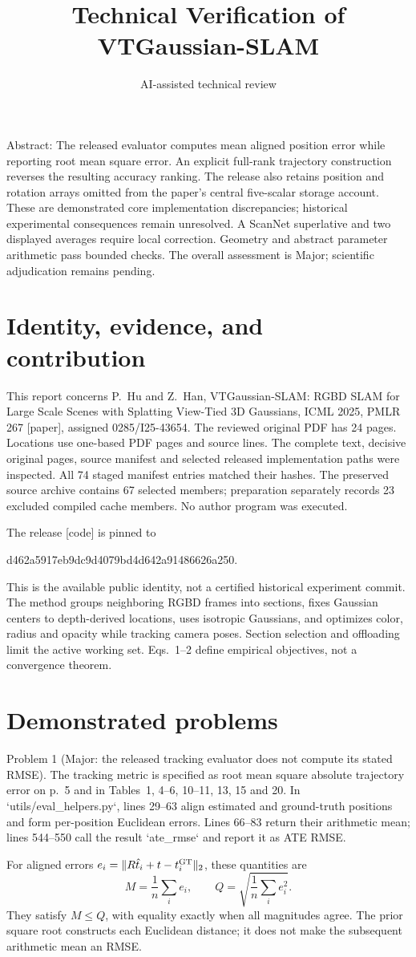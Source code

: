 \documentclass[10pt]{article}
\title{Technical Verification of VTGaussian-SLAM}
\author{AI-assisted technical review}
\date{}
\begin{document}
\maketitle
Abstract: The released evaluator computes mean aligned position error while reporting root mean square error. An explicit full-rank trajectory construction reverses the resulting accuracy ranking. The release also retains position and rotation arrays omitted from the paper’s central five-scalar storage account. These are demonstrated core implementation discrepancies; historical experimental consequences remain unresolved. A ScanNet superlative and two displayed averages require local correction. Geometry and abstract parameter arithmetic pass bounded checks. The overall assessment is Major; scientific adjudication remains pending.\par
\section*{Identity, evidence, and contribution}
This report concerns P. Hu and Z. Han, VTGaussian-SLAM: RGBD SLAM for Large Scale Scenes with Splatting View-Tied 3D Gaussians, ICML 2025, PMLR 267 [paper], assigned 0285/I25-43654. The reviewed original PDF has 24 pages. Locations use one-based PDF pages and source lines. The complete text, decisive original pages, source manifest and selected released implementation paths were inspected. All 74 staged manifest entries matched their hashes. The preserved source archive contains 67 selected members; preparation separately records 23 excluded compiled cache members. No author program was executed.\par
The release [code] is pinned to\par
d462a5917eb9dc9d4079bd4d642a91486626a250.\par
This is the available public identity, not a certified historical experiment commit. The method groups neighboring RGBD frames into sections, fixes Gaussian centers to depth-derived locations, uses isotropic Gaussians, and optimizes color, radius and opacity while tracking camera poses. Section selection and offloading limit the active working set. Eqs. 1–2 define empirical objectives, not a convergence theorem.\par
\section*{Demonstrated problems}
Problem 1 (Major: the released tracking evaluator does not compute its stated RMSE).  The tracking metric is specified as root mean square absolute trajectory error on p. 5 and in Tables 1, 4–6, 10–11, 13, 15 and 20. In `utils/eval\_helpers.py`, lines 29–63 align estimated and ground-truth positions and form per-position Euclidean errors. Lines 66–83 return their arithmetic mean; lines 544–550 call the result `ate\_rmse` and report it as ATE RMSE.\par
For aligned errors \(e_i=\|R\hat t_i+t-t_i^{\rm GT}\|_2\), these quantities are \[M=\frac1n\sum_i e_i,\qquad Q=\sqrt{\frac1n\sum_i e_i^2}.\] They satisfy \(M\le Q\), with equality exactly when all magnitudes agree. The prior square root constructs each Euclidean distance; it does not make the subsequent arithmetic mean an RMSE.\par
\end{document}
